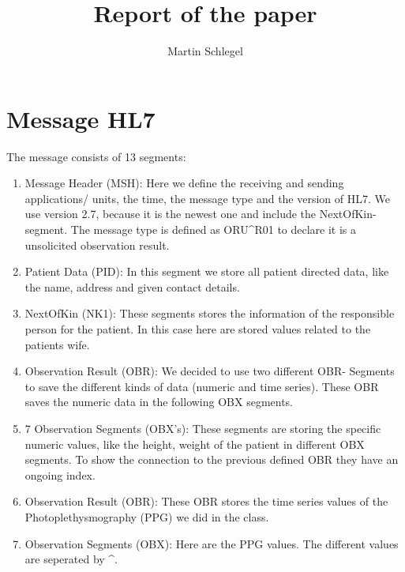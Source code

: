 \documentclass[11pt,a4paper,ngerman]{article}
\title{Report of the paper}
\author{Martin Schlegel}
\begin{document}
\maketitle

\section{Message HL7}
The message consists of 13 segments:
\begin{enumerate}
  \item Message Header (MSH): Here we define the receiving and sending applications/ units, the time, the message type and the version of HL7. We use version 2.7, because it is the newest one and include the NextOfKin-segment. The message type is defined as ORU\textasciicircum R01 to declare it is a unsolicited observation result.
  \item Patient Data (PID): In this segment we store all patient directed data, like the name, address and given contact details.
  \item NextOfKin (NK1): These segments stores the information of the responsible person for the patient. In this case here are stored values related to the patients wife.
  \item Observation Result (OBR): We decided to use two different OBR- Segments to save the different kinds of data (numeric and time series). These OBR saves the numeric data in the following OBX segments.
  \item 7 Observation Segments (OBX's): These segments are storing the specific numeric values, like the height, weight of the patient in different OBX segments. To show the connection to the previous defined OBR they have an ongoing index.
  \item Observation Result (OBR): These OBR stores the time series values of the Photoplethysmography (PPG) we did in the class.
  \item Observation Segments (OBX): Here are the PPG values. The different values are seperated by \textasciicircum.
\end{enumerate}
\end{document}
